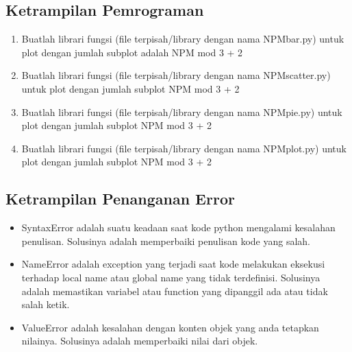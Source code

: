 \subsection{Ketrampilan Pemrograman}
\begin{enumerate}
    \item Buatlah librari fungsi (file terpisah/library dengan nama NPMbar.py) untuk plot dengan jumlah subplot adalah NPM mod 3 + 2
    
    
    \item Buatlah librari fungsi (file terpisah/library dengan nama NPMscatter.py) untuk plot dengan jumlah subplot NPM mod 3 + 2
    
    
    \item Buatlah librari fungsi (file terpisah/library dengan nama NPMpie.py) untuk plot dengan jumlah subplot NPM mod 3 + 2
    
    
    \item Buatlah librari fungsi (file terpisah/library dengan nama NPMplot.py) untuk plot dengan jumlah subplot NPM mod 3 + 2
    
\end{enumerate}

\subsection{Ketrampilan Penanganan Error}
\begin{itemize}
    \item SyntaxError adalah suatu keadaan saat kode python mengalami kesalahan penulisan. Solusinya adalah memperbaiki penulisan kode yang salah.
    
    \item NameError adalah exception yang terjadi saat kode melakukan eksekusi terhadap local name atau global name yang tidak terdefinisi. Solusinya adalah memastikan variabel atau function yang dipanggil ada atau tidak salah ketik.
    
    \item ValueError adalah kesalahan dengan konten objek yang anda tetapkan nilainya. Solusinya adalah memperbaiki nilai dari objek.
    
\end{itemize}


